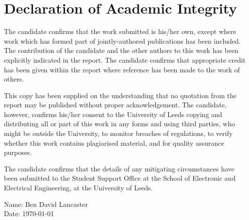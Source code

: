 \documentclass[11pt,a4paper]{report}
\begin{document}
\chapter*{Declaration of Academic Integrity}

The candidate confirms that the work submitted is his/her own, except where work which has formed part of jointly-authored publications has been included. The contribution of the candidate and the other authors to this work has been explicitly indicated in the report. The candidate confirms that appropriate credit has been given within the report where reference has been made to the work of others.

This copy has been supplied on the understanding that no quotation from the report may be published without proper acknowledgement. The candidate, however, confirms his/her consent to the University of Leeds copying and distributing all or part of this work in any forms and using third parties, who might be outside the University, to monitor breaches of regulations, to verify whether this work contains plagiarised material, and for quality assurance purposes.

The candidate confirms that the details of any mitigating circumstances have been submitted to the Student Support Office at the School of Electronic and Electrical Engineering, at the University of Leeds.
\vfill

\noindent 
Name: Ben David Lancaster \\
Date: \today
\newpage
\end{document}
